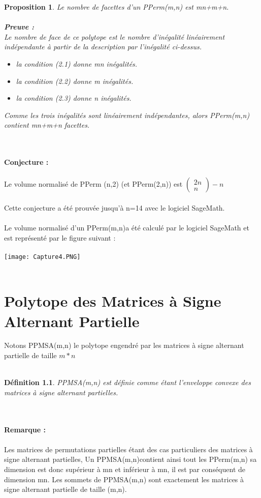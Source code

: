 \documentclass{book}
\newtheorem{petit_nom1}{Proposition}
\newtheorem{petit_nom2}{Définition}[chapter]
\begin{document}
 \begin{petit_nom1}
 Le nombre de facettes d'un PPerm(m,n) est mn+m+n.\\\\
 \textbf{Preuve :}\\
 Le nombre de face de ce polytope est le nombre d'inégalité linéairement indépendante à partir de la description par l'inégalité ci-dessus. \\
 \begin{itemize}
 \item la condition (2.1) donne mn inégalités.
 \item la condition (2.2) donne m inégalités.
 \item la condition (2.3) donne n inégalités.
 \end{itemize}
 Comme les trois inégalités sont linéairement indépendantes, alors PPerm(m,n) contient mn+m+n facettes. 
 \end{petit_nom1} \\\\
 \textbf{Conjecture : }\\\\
 Le volume normalisé de PPerm (n,2) (et PPerm(2,n)) est $\begin{pmatrix}
 2n\\n
 \end{pmatrix}  - n$ \\\\
 Cette conjecture a été prouvée jusqu'à n=14 avec le logiciel SageMath. \\\\
 Le volume normalisé d'un PPerm(m,n)a été calculé par le logiciel SageMath et est représenté par le figure suivant :\\\\
 \texttt{[image: Capture4.PNG]} \\\\ 
 
\chapter{Polytope des Matrices à Signe Alternant Partielle}
Notons PPMSA(m,n) le polytope engendré par les matrices à signe alternant partielle de taille $m*n$ \\\\
\begin{petit_nom2}
PPMSA(m,n) est définie comme étant l'enveloppe convexe des matrices à signe alternant partielles. \\\\
\end{petit_nom2} \\
\textbf{Remarque :}\\\\
Les matrices de permutations partielles étant des cas particuliers des matrices à signe alternant partielles, Un PPMSA(m,n)contient ainsi tout les PPerm(m,n) sa dimension est donc supérieur à mn et inférieur à mn, il est par conséquent de dimension mn. 
Les sommets de PPMSA(m,n) sont exactement les matrices à signe alternant partielle de taille (m,n).
\end{document}

